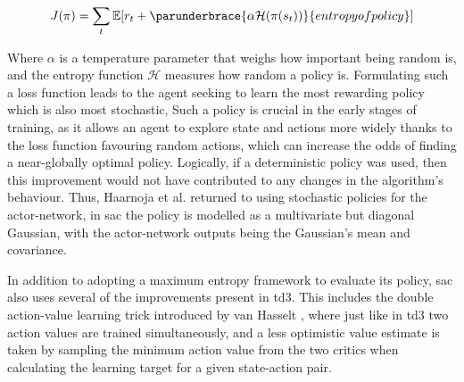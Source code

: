\documentclass[../report.tex]{subfiles}
\begin{document}
{\myfont
\begin{equation}
    J(\pi) = \sum\limits_t \mathbb{E}[r_t + \parunderbrace{\alpha \mathcal{H}(\pi(s_t))}{entropy of policy}]
\end{equation}
}

Where $\alpha$ is a temperature parameter that weighs how important being random is, and the entropy function $\mathcal{H}$ measures how random a policy is. Formulating such a loss function leads to the agent seeking to learn the most rewarding policy which is also most stochastic, Such a policy is crucial in the early stages of training, as it allows an agent to explore state and actions more widely thanks to the loss function favouring random actions, which can increase the odds of finding a near-globally optimal policy. Logically, if a deterministic policy was used, then this improvement would not have contributed to any changes in the algorithm's behaviour. Thus, Haarnoja et al. returned to using stochastic policies for the actor-network, in \ac{sac} the policy is modelled as a multivariate but diagonal Gaussian, with the actor-network outputs being the Gaussian's mean and covariance.

In addition to adopting a maximum entropy framework to evaluate its policy, \ac{sac} also uses several of the improvements present in \ac{td3}. This includes the double action-value learning trick introduced by van Hasselt \cite{double_q_learning}, where just like in \ac{td3} two action values are trained simultaneously, and a less optimistic value estimate is taken by sampling the minimum action value from the two critics when calculating the learning target for a given state-action pair. 


\end{document}
